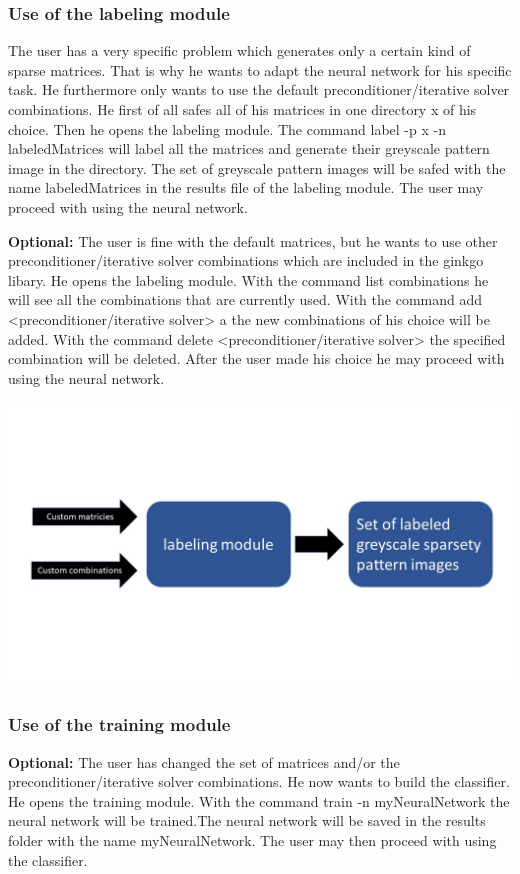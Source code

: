 \documentclass[parskip=full]{scrartcl}
\begin{document}
\subsubsection{Use of the \gls{labeling module}}
The user has a very specific problem which generates only a certain kind of sparse matrices. That is why he wants to adapt the \gls{neural network} for his specific task. He furthermore only wants to use the default \gls{preconditioner}/\gls{iterative solver} combinations. He first of all safes all of his matrices in one directory x of his choice. Then he opens the \gls{labeling module}. The command label -p x -n labeledMatrices will label all the matrices and generate their greyscale pattern image in the directory. The set of greyscale pattern images will be safed with the name labeledMatrices in the results file of the \gls{labeling module}. The user may proceed with using the \gls{neural network}.


\textbf{Optional:} The user is fine with the default matrices, but he wants to use other \gls{preconditioner}/\gls{iterative solver} combinations which are included in the ginkgo libary. He opens the \gls{labeling module}. With the command list combinations he will see all the combinations that are currently used. With the command add <\gls{preconditioner}/\gls{iterative solver}> a the new combinations of his choice will be added. With the command delete <\gls{preconditioner}/\gls{iterative solver}> the specified combination will be deleted. After the user made his choice he may proceed with using the \gls{neural network}.
\begin{center}
\includegraphics[width=\textwidth]{labelingModule}
\end{center}


\subsubsection{Use of the \gls{training module}}
\textbf{Optional:} The user has changed the set of matrices and/or the \gls{preconditioner}/\gls{iterative solver} combinations. He now wants to build the classifier. He opens the \gls{training module}. With the command train -n myNeuralNetwork the \gls{neural network} will be trained.The \gls{neural network} will be saved in the results folder with the name myNeuralNetwork.  The user may then proceed with using the classifier.
\end{document}
